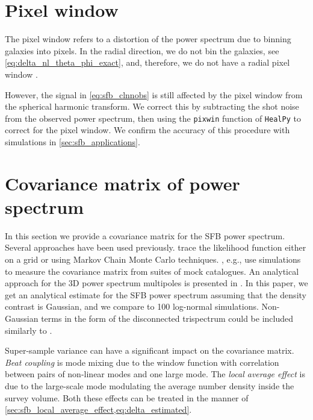 \documentclass[aps,prd,reprint,floatfix,superscriptaddress,showkeys,nofootinbib]{revtex4-1}
\begin{document}
\section{Pixel window}
The pixel window refers to a distortion of the power spectrum due to binning
galaxies into pixels. In the radial direction, we do not bin the galaxies, see
\cref{eq:delta_nl_theta_phi_exact}, and, therefore, we do not have a radial
pixel window \citep{Leistedt+:2012A&A...540A..60L}.

However, the signal in \cref{eq:sfb_clnnobs} is still affected by the pixel
window from the spherical harmonic transform. We correct this by subtracting
the shot noise from the observed power spectrum, then using the \texttt{pixwin}
function of \texttt{HealPy} to correct for the pixel window. We confirm the
accuracy of this procedure with simulations in \cref{sec:sfb_applications}.







\section{Covariance matrix of power spectrum}
\label{sec:sfb_covariance}
In this section we provide a covariance matrix for the SFB power spectrum.
Several approaches have been used previously.
\citet{Percival+:2004MNRAS.353.1201P,Wang+:2020JCAP...10..022W} trace the
likelihood function either on a grid or using Markov Chain Monte Carlo
techniques. \citet{Wang+:2020JCAP...10..022W}, e.g., use simulations to measure
the covariance matrix from suites of mock catalogues. An analytical approach
for the 3D power spectrum multipoles is presented in
\citet{Wadekar+:2020PhRvD.102l3517W}. In this paper, we get an analytical
estimate for the SFB power spectrum assuming that the density contrast is
Gaussian, and we compare to 100 log-normal simulations. Non-Gaussian terms in
the form of the disconnected trispectrum could be included similarly to
\citet{Taruya+:2021PhRvD.103b3501T,Sugiyama+:2020MNRAS.497.1684S}.

Super-sample variance \citep[e.g.,][]{dePutter+:2012JCAP...04..019D,
Lacasa+:2019A&A...624A..61L, Li+:2018JCAP...02..022L} can have a significant
impact on the covariance matrix. \emph{Beat coupling} is mode mixing due to the
window function with correlation between pairs of non-linear modes and one
large mode. The \emph{local average effect} is due to the large-scale mode
modulating the average number density inside the survey volume. Both these
effects can be treated in the manner of
\cref{sec:sfb_local_average_effect,eq:delta_estimated}.
\end{document}
